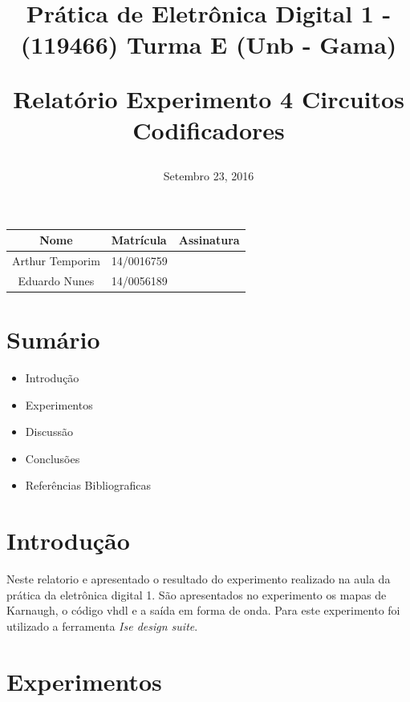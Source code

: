 \documentclass[12pts]{article}
\title{
	Prática de Eletrônica Digital 1 - (119466)
	\singlespacing
		Turma E (Unb - Gama)
	\singlespacing
	\begin{midpage}
	\begin {large}
		Relatório Experimento 4
		\singlespace
		Circuitos Codificadores
	\end {large}
	\end{midpage}
}
\date{Setembro 23, 2016}
\begin{document}
\maketitle	
\begin{center}

\begin{tabular}{|c|l|r|}
\hline
Nome & Matrícula & Assinatura\\
\hline

Arthur Temporim & 14/0016759 & \\
\hline	
Eduardo Nunes & 14/0056189 & \\

\hline	
\end{tabular}

\end{center}


\newpage

\section{Sumário}

\begin{itemize}
	\item Introdução
	\singlespacing
	\item Experimentos
	\singlespacing
	\item Discussão
	\singlespacing
	\item Conclusões 
	\singlespacing
	\item Referências Bibliograficas
	\singlespacing
\end{itemize}

\newpage


\section{Introdução}

	 Neste relatorio e apresentado o resultado do experimento realizado na aula da prática da eletrônica digital 1. São apresentados no experimento os mapas de Karnaugh, o código vhdl e a saída em forma de onda. Para este experimento foi utilizado a ferramenta \textit{Ise design suite}.

\section{Experimentos}

\end{document}
